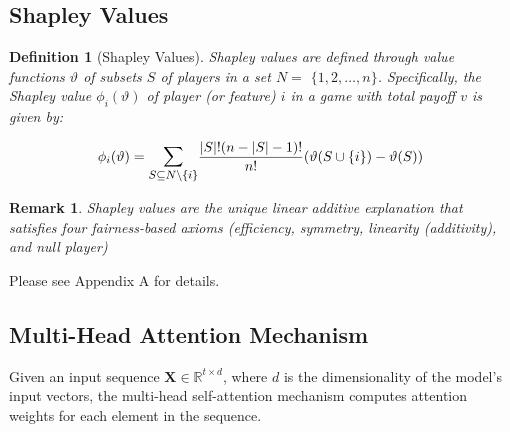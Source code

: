 \documentclass{article} %
\theoremstyle{bfnote}
\newtheorem{definition}[theorem]{Definition}
\newtheorem{remark}[theorem]{Remark}
\begin{document}
\subsection{Shapley Values}
\begin{definition} [Shapley Values]
	Shapley values are defined through value functions $\vartheta$ of subsets $S$ of players in a set $N=$ $\{1,2, \ldots, n\}$. Specifically, the Shapley value $\phi_i(\vartheta)$ of player (or feature) $i$ in a game with total payoff $v$ is given by:
\end{definition}

\begin{equation}
	\phi_i(\vartheta)=\mathlarger{\sum\limits_{S \subseteq N \backslash\{i\}}} \frac{|S| !(n-|S|-1) !}{n !}(\vartheta(S \cup\{i\})-\vartheta(S))
	\label{eq:4}
\end{equation}

\begin{remark}
Shapley values are the unique linear additive explanation that satisfies four fairness-based axioms (efficiency, symmetry, linearity (additivity), and null player)
\end{remark} Please see Appendix A for details.

\subsection{Multi-Head Attention Mechanism}
Given an input sequence $\bm{X}\in \mathbb{R}^{t \times d}$, where $d$ is the dimensionality of the model's input vectors, the multi-head self-attention mechanism computes attention weights for each element in the sequence.
\end{document}
